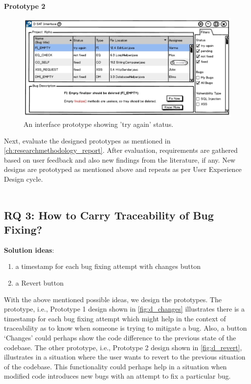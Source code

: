 \clearpage

\textbf{Prototype 2}

\begin{figure}[hbt!]
	\centering
	\includegraphics[width=\linewidth]{figures/d_tryagain}
	\caption{An interface prototype showing 'try again' status.}
	\label{fig:d_tryagain}
\end{figure}

Next, evaluate the designed prototypes as mentioned in \autoref{ch:researchmethodology_report}. After evaluation, requirements are gathered based on user feedback and also new findings from the literature, if any. New designs are prototyped as mentioned above and repeats as per User Experience Design cycle. \\ \\

\subsection{RQ 3: How to Carry Traceability of Bug Fixing?}

\textbf{Solution ideas}: \\
\begin{enumerate}
\item  a timestamp for each bug fixing attempt with changes button
\item  a Revert button
\end{enumerate}

With the above mentioned possible ideas, we design the prototypes. The prototype, i.e., Prototype 1 design shown in \autoref{fig:d_changes} illustrates there is a timestamp for each bug fixing attempt which might help in the context of traceability as to know when someone is trying to mitigate a bug. Also, a button ‘Changes’ could perhaps show the code difference to the previous state of the codebase. The other prototype, i.e., Prototype 2 design shown in \autoref{fig:d_revert}, illustrates in a situation where the user wants to revert to the previous situation of the codebase. This functionality could perhaps help in a situation when modified code introduces new bugs with an attempt to fix a particular bug. \\ \\

